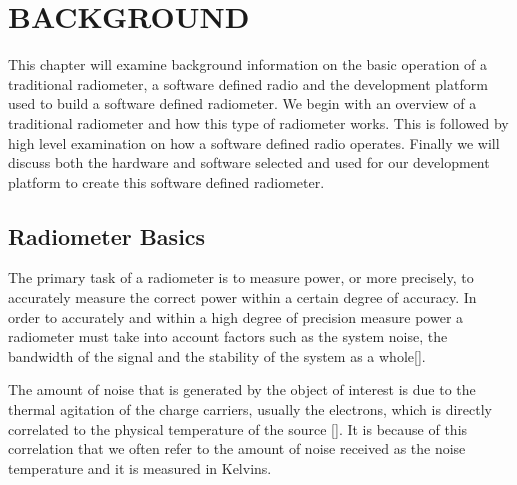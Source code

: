 

\chapter{BACKGROUND}\label{ch:background}

This chapter will examine background information on the basic operation of a traditional radiometer, a software defined radio and the development platform used to build a software defined radiometer.  We begin with an overview of a traditional radiometer and how this type of radiometer works.  This is followed by high level examination on how a software defined radio operates.  Finally we will discuss both the hardware and software selected and used for our development platform to create this software defined radiometer.

\section{Radiometer Basics}\label{rad_basics}

The primary task of a radiometer is to measure power, or more precisely, to accurately measure the correct power within a certain degree of accuracy.  In order to accurately and within a high degree of precision measure power a radiometer must take into account factors such as the system noise, the bandwidth of the signal and the stability of the system as a whole[\cite{Evans}]. 

The amount of noise that is generated by the object of interest is due to the thermal agitation of the charge carriers, usually the electrons, which is directly correlated to the physical temperature of the source [\cite{Nyquist1928thermal}].  It is because of this correlation that we often refer to the amount of noise received as the noise temperature and it is measured in Kelvins. 

